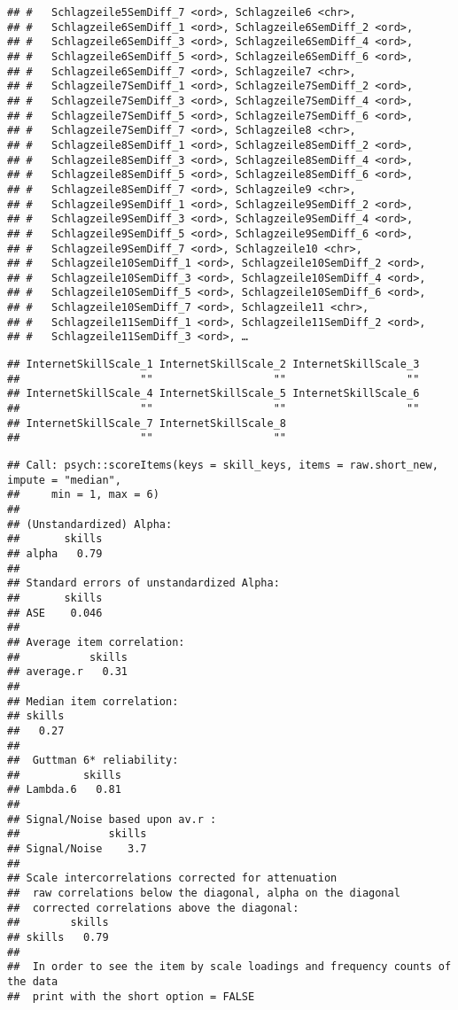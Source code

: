 \documentclass[]{article}
\begin{document}
\begin{verbatim}
## #   Schlagzeile5SemDiff_7 <ord>, Schlagzeile6 <chr>,
## #   Schlagzeile6SemDiff_1 <ord>, Schlagzeile6SemDiff_2 <ord>,
## #   Schlagzeile6SemDiff_3 <ord>, Schlagzeile6SemDiff_4 <ord>,
## #   Schlagzeile6SemDiff_5 <ord>, Schlagzeile6SemDiff_6 <ord>,
## #   Schlagzeile6SemDiff_7 <ord>, Schlagzeile7 <chr>,
## #   Schlagzeile7SemDiff_1 <ord>, Schlagzeile7SemDiff_2 <ord>,
## #   Schlagzeile7SemDiff_3 <ord>, Schlagzeile7SemDiff_4 <ord>,
## #   Schlagzeile7SemDiff_5 <ord>, Schlagzeile7SemDiff_6 <ord>,
## #   Schlagzeile7SemDiff_7 <ord>, Schlagzeile8 <chr>,
## #   Schlagzeile8SemDiff_1 <ord>, Schlagzeile8SemDiff_2 <ord>,
## #   Schlagzeile8SemDiff_3 <ord>, Schlagzeile8SemDiff_4 <ord>,
## #   Schlagzeile8SemDiff_5 <ord>, Schlagzeile8SemDiff_6 <ord>,
## #   Schlagzeile8SemDiff_7 <ord>, Schlagzeile9 <chr>,
## #   Schlagzeile9SemDiff_1 <ord>, Schlagzeile9SemDiff_2 <ord>,
## #   Schlagzeile9SemDiff_3 <ord>, Schlagzeile9SemDiff_4 <ord>,
## #   Schlagzeile9SemDiff_5 <ord>, Schlagzeile9SemDiff_6 <ord>,
## #   Schlagzeile9SemDiff_7 <ord>, Schlagzeile10 <chr>,
## #   Schlagzeile10SemDiff_1 <ord>, Schlagzeile10SemDiff_2 <ord>,
## #   Schlagzeile10SemDiff_3 <ord>, Schlagzeile10SemDiff_4 <ord>,
## #   Schlagzeile10SemDiff_5 <ord>, Schlagzeile10SemDiff_6 <ord>,
## #   Schlagzeile10SemDiff_7 <ord>, Schlagzeile11 <chr>,
## #   Schlagzeile11SemDiff_1 <ord>, Schlagzeile11SemDiff_2 <ord>,
## #   Schlagzeile11SemDiff_3 <ord>, …
\end{verbatim}

\begin{verbatim}
## InternetSkillScale_1 InternetSkillScale_2 InternetSkillScale_3 
##                   ""                   ""                   "" 
## InternetSkillScale_4 InternetSkillScale_5 InternetSkillScale_6 
##                   ""                   ""                   "" 
## InternetSkillScale_7 InternetSkillScale_8 
##                   ""                   ""
\end{verbatim}

\begin{verbatim}
## Call: psych::scoreItems(keys = skill_keys, items = raw.short_new, impute = "median", 
##     min = 1, max = 6)
## 
## (Unstandardized) Alpha:
##       skills
## alpha   0.79
## 
## Standard errors of unstandardized Alpha:
##       skills
## ASE    0.046
## 
## Average item correlation:
##           skills
## average.r   0.31
## 
## Median item correlation:
## skills 
##   0.27 
## 
##  Guttman 6* reliability: 
##          skills
## Lambda.6   0.81
## 
## Signal/Noise based upon av.r : 
##              skills
## Signal/Noise    3.7
## 
## Scale intercorrelations corrected for attenuation 
##  raw correlations below the diagonal, alpha on the diagonal 
##  corrected correlations above the diagonal:
##        skills
## skills   0.79
## 
##  In order to see the item by scale loadings and frequency counts of the data
##  print with the short option = FALSE
\end{verbatim}
\end{document}
